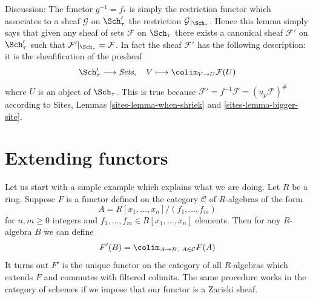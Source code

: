\noindent
Discussion:
The functor $g^{-1} = f_*$ is simply the restriction functor which associates
to a sheaf $\mathcal{G}$ on $\Sch'_\tau$ the restriction
$\mathcal{G}|_{\Sch_\tau}$. Hence this lemma simply says that given
any sheaf of sets $\mathcal{F}$ on $\Sch_\tau$ there exists a
canonical sheaf $\mathcal{F}'$ on $\Sch'_\tau$ such that
$\mathcal{F}'|_{\Sch_\tau} = \mathcal{F}$. In fact the sheaf
$\mathcal{F}'$ has the following description: it is the sheafification
of the presheaf
$$
\Sch'_\tau \longrightarrow \textit{Sets}, \quad
V \longmapsto \colim_{V \to U} \mathcal{F}(U)
$$
where $U$ is an object of $\Sch_\tau$. This is true because
$\mathcal{F}' = f^{-1}\mathcal{F} = (u_p\mathcal{F})^\#$ according to
Sites, Lemmas \ref{sites-lemma-when-shriek} and \ref{sites-lemma-bigger-site}.






\section{Extending functors}
\label{section-extending-functors}

\noindent
Let us start with a simple example which explains what we are doing.
Let $R$ be a ring. Suppose $F$ is a functor defined on the category
$\mathcal{C}$ of $R$-algebras of the form
$$
A = R[x_1, \ldots, x_n]/(f_1, \ldots, f_m)
$$
for $n, m \geq 0$ integers and $f_1, \ldots, f_m \in R[x_1, \ldots, x_n]$
elements. Then for any $R$-algebra $B$ we can define
$$
F'(B) = \colim_{A \to B,\ A \in \mathcal{C}} F(A)
$$
It turns out $F'$ is the unique functor on the category
of all $R$-algebras which extends $F$ and commutes with filtered
colimits. The same procedure works in the category of schemes
if we impose that our functor is a Zariski sheaf.

